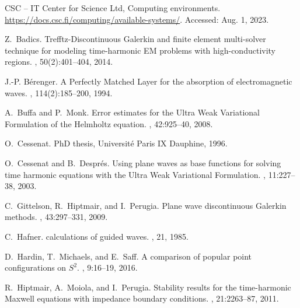 \documentclass[a4paper,12pt]{article}
\begin{document}
%
%




\begin{thebibliography}{10}

{CSC – IT C}enter for {S}cience {L}td, {C}omputing environments.
\newblock \url{https://docs.csc.fi/computing/available-systems/}.
\newblock Accessed: Aug. 1, 2023.

Z.~Badics.
\newblock Trefftz-{D}iscontinuous {G}alerkin and finite element multi-solver
  technique for modeling time-harmonic {EM} problems with high-conductivity
  regions.
, 50(2):401--404, 2014.

J.-P. B\'erenger.
\newblock A {P}erfectly {M}atched {L}ayer for the absorption of electromagnetic
  waves.
, 114(2):185--200, 1994.

A.~Buffa and P.~Monk.
\newblock Error estimates for the {U}ltra {W}eak {V}ariational {F}ormulation of
  the {H}elmholtz equation.
,
  42:925--40, 2008.

O.~Cessenat.
\newblock PhD thesis, Universit\'{e} Paris IX Dauphine, 1996.

O.~Cessenat and B.~Despr\'{e}s.
\newblock Using plane waves as base functions for solving time harmonic
  equations with the {U}ltra {W}eak {V}ariational {F}ormulation.
, 11:227--38, 2003.

C.~Gittelson, R.~Hiptmair, and I.~Perugia.
\newblock Plane wave discontinuous {G}alerkin methods.
,
  43:297--331, 2009.

C.~Hafner.
 calculations of guided waves.
, 21, 1985.

D.~Hardin, T.~Michaels, and E.~Saff.
\newblock A comparison of popular point configurations on ${S}^2$.
, 9:16--19, 2016.

R.~Hiptmair, A.~Moiola, and I.~Perugia.
\newblock Stability results for the time-harmonic {M}axwell equations with
  impedance boundary conditions.
, 21:2263--87, 2011.


\end{thebibliography}
\end{document}
